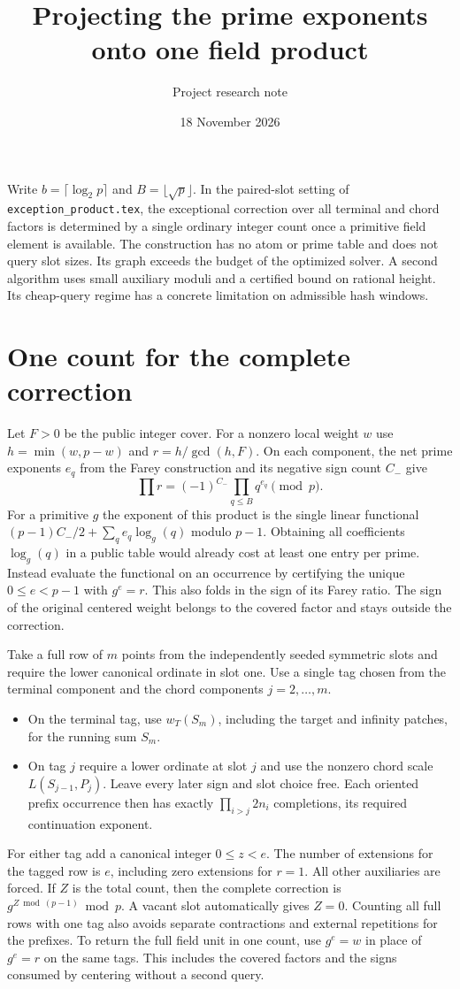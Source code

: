 \documentclass[11pt]{article}
\title{Projecting the prime exponents onto one field product}
\author{Project research note}
\date{18 November 2026}
\begin{document}
\maketitle

Write $b=\lceil\log_2 p\rceil$ and $B=\lfloor\sqrt p\rfloor$.
In the paired-slot setting of \texttt{exception\_product.tex}, the
exceptional correction over all terminal and chord factors is determined
by a single ordinary integer count once a primitive field element is
available. The construction has no atom or prime table and does not
query slot sizes. Its graph exceeds the budget of the optimized solver.
A second algorithm uses small auxiliary moduli and a certified bound
on rational height. Its cheap-query regime has a concrete limitation
on admissible hash windows.

\section{One count for the complete correction}
Let $F>0$ be the public integer cover. For a nonzero local weight $w$
use $h=\min(w,p-w)$ and $r=h/\gcd(h,F)$. On each component, the net
prime exponents $e_q$ from the Farey construction and its negative
sign count $C_-$ give
\[
 \prod r=(-1)^{C_-}\prod_{q\le B}q^{e_q}\pmod p .
\]
For a primitive $g$ the exponent of this product is the single
linear functional $(p-1)C_-/2+\sum_q e_q\log_g(q)$ modulo $p-1$.
Obtaining all coefficients $\log_g(q)$ in a public table would
already cost at least one entry per prime. Instead evaluate the
functional on an occurrence by certifying the unique $0\le e<p-1$
with $g^e=r$. This also folds in the sign of its Farey ratio.
The sign of the original centered weight belongs to the covered
factor and stays outside the correction.

Take a full row of $m$ points from the independently seeded symmetric
slots and require the lower canonical ordinate in slot one. Use a
single tag chosen from the terminal component and the chord
components $j=2,\ldots,m$.
\begin{itemize}
\item On the terminal tag, use $w_T(S_m)$, including the target and
infinity patches, for the running sum $S_m$.
\item On tag $j$ require a lower ordinate at slot $j$ and use the
nonzero chord scale $L(S_{j-1},P_j)$. Leave every later sign and slot
choice free. Each oriented prefix occurrence then has exactly
$\prod_{i>j}2n_i$ completions, its required continuation exponent.
\end{itemize}
For either tag add a canonical integer $0\le z<e$. The number of
extensions for the tagged row is $e$, including zero extensions for
$r=1$. All other auxiliaries are forced. If $Z$ is the total count,
then the complete correction is $g^{Z\bmod(p-1)}\bmod p$. A vacant slot
automatically gives $Z=0$. Counting all full rows with one tag also
avoids separate contractions and external repetitions for the prefixes.
To return the full field unit in one count, use $g^e=w$ in place of
$g^e=r$ on the same tags. This includes the covered factors and the
signs consumed by centering without a second query.
\end{document}
